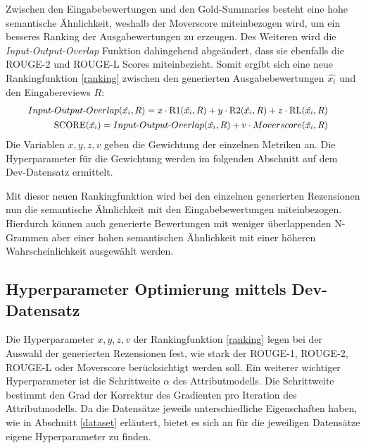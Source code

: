 Zwischen den Eingabebewertungen und den Gold-Summaries besteht eine hohe semantische Ähnlichkeit, weshalb der Moverscore miteinbezogen wird, um ein besseres Ranking der Ausgabewertungen zu erzeugen.
Des Weiteren wird die \textit{Input-Output-Overlap} Funktion dahingehend abgeändert, dass sie ebenfalls die ROUGE-2 und ROUGE-L Scores miteinbezieht.
Somit ergibt sich eine neue Rankingfunktion \ref{ranking} zwischen den generierten Ausgabebewertungen $\hat{x_i}$ und den Eingabereviews $R$:
\begin{align}
    \small
    \begin{split}
    Input\text{-}Output\text{-}Overlap(\hat{x_i}, R) &= x \cdot \text{R1}(\hat{x_i}, R)+y\cdot \text{R2}(\hat{x_i}, R)+z\cdot \text{RL}(\hat{x_i}, R)  \label{ranking}
\end{split}\\
\small
\begin{split}
    \text{SCORE}(\hat{x_i}) &= Input\text{-}Output\text{-}Overlap(\hat{x_i}, R) + v \cdot Moverscore(\hat{x_i}, R) 
\end{split}
\end{align}
Die Variablen $x,y,z,v$ geben die Gewichtung der einzelnen Metriken an. 
Die Hyperparameter für die Gewichtung werden im folgenden Abschnitt auf dem Dev-Datensatz ermittelt.

Mit dieser neuen Rankingfunktion wird bei den einzelnen generierten Rezensionen nun die semantische Ähnlichkeit mit den Eingabebewertungen miteinbezogen. 
Hierdurch können auch generierte Bewertungen mit weniger überlappenden N-Grammen aber einer hohen semantischen Ähnlichkeit mit einer höheren Wahrscheinlichkeit ausgewählt werden.

\pagebreak
\subsection{Hyperparameter Optimierung mittels Dev-Datensatz}
\label{eval_pplm}
Die Hyperparameter $x,y,z,v$ der Rankingfunktion \ref{ranking} legen bei der Auswahl der generierten Rezensionen fest, wie stark der ROUGE-1, ROUGE-2, ROUGE-L oder Moverscore berücksichtigt werden soll.
Ein weiterer wichtiger Hyperparameter ist die Schrittweite $\alpha$ des Attributmodells. Die Schrittweite bestimmt den Grad der Korrektur des Gradienten pro Iteration des Attributmodells. 
Da die Datensätze jeweils unterschiedliche Eigenschaften haben, wie in Abschnitt \ref{dataset} erläutert, bietet es sich an für die jeweiligen Datensätze eigene Hyperparameter zu finden.

